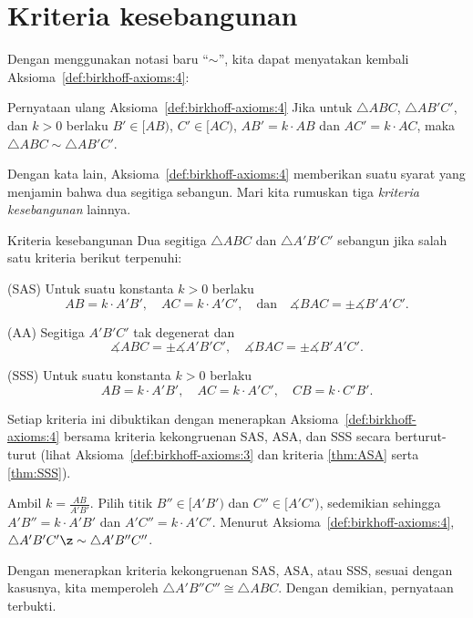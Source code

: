 \section{Kriteria kesebangunan}

Dengan menggunakan notasi baru ``$\sim$'', kita dapat menyatakan kembali Aksioma~\ref{def:birkhoff-axioms:4}:

\begin{thm}{Pernyataan ulang Aksioma~\ref{def:birkhoff-axioms:4}}
Jika untuk
$\triangle ABC$,
$\triangle AB'C'$,
dan $k>0$ berlaku
$B'\in [AB)$,
$C'\in [AC)$,
$AB'=k\cdot AB$ dan
$AC'=k\cdot AC$,
maka $\triangle ABC\sim\triangle AB'C'$.
\end{thm}

Dengan kata lain, Aksioma~\ref{def:birkhoff-axioms:4} memberikan
suatu syarat yang menjamin bahwa dua segitiga sebangun.
Mari kita rumuskan tiga {}\emph{kriteria kesebangunan} lainnya.

\begin{thm}{Kriteria kesebangunan}\label{prop:sim}
Dua segitiga
$\triangle ABC$ dan $\triangle A'B'C'$
sebangun jika salah satu kriteria berikut terpenuhi:

(SAS)
Untuk suatu konstanta $k>0$ berlaku
\[A B=k\cdot A' B',
\quad
A C=k\cdot A' C',
\quad
\text{dan}
\quad
\measuredangle B A C=\pm\measuredangle B' A' C'.\]

(AA) Segitiga $A' B' C'$ tak degenerat
dan
$$\measuredangle A B C
=
\pm\measuredangle A' B' C',
\quad
\measuredangle B A C
=
\pm\measuredangle B' A' C'.$$

(SSS) Untuk suatu konstanta $k>0$ berlaku
$$A B=k\cdot A' B',
\quad
A C=k\cdot A' C',
\quad
CB=k\cdot C'B'.$$

\end{thm}

Setiap kriteria ini dibuktikan dengan menerapkan Aksioma~\ref{def:birkhoff-axioms:4} bersama kriteria kekongruenan SAS, ASA, dan SSS secara berturut-turut
(lihat Aksioma~\ref{def:birkhoff-axioms:3} dan kriteria \ref{thm:ASA} serta \ref{thm:SSS}).


Ambil $k=\tfrac{AB}{A'B'}$.
Pilih titik $B''\in [A'B')$ dan $C''\in [A'C')$,
sedemikian sehingga $A'B''=k\cdot A'B'$ dan $A'C''=k\cdot A'C'$.
Menurut Aksioma~\ref{def:birkhoff-axioms:4},
$\triangle A'B'C'\z\sim \triangle A'B''C''$.

Dengan menerapkan kriteria kekongruenan SAS, ASA, atau SSS, sesuai dengan kasusnya,
kita memperoleh $\triangle A'B''C''\cong \triangle ABC$.
Dengan demikian, pernyataan terbukti.
\qeds

